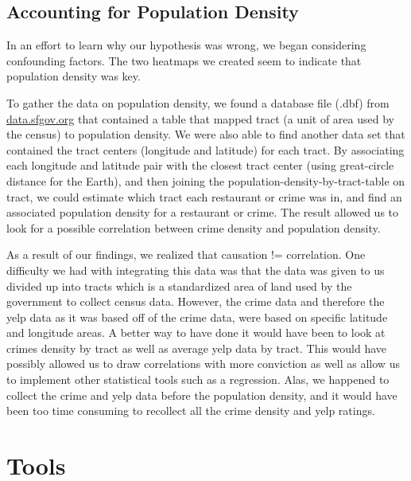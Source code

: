 \documentclass{article}
\begin{document}
\subsection{Accounting for Population Density}

In an effort to learn why our hypothesis was wrong, we began considering
confounding factors. The two heatmaps we created seem to indicate that
population density was key.


To gather the data on population density, we found a database file (.dbf)
from \url{data.sfgov.org} that contained a table that mapped tract (a unit
of area used by the census) to population density. We were also able to
find another data set that contained the tract centers (longitude and
latitude) for each tract. By associating each longitude and latitude pair
with the closest tract center (using great-circle distance for the Earth),
and then joining the population-density-by-tract-table on tract, we could
estimate which tract each restaurant or crime was in, and find an
associated population density for a restaurant or crime. The result allowed
us to look for a possible correlation between crime density and population
density.

As a result of our findings, we realized that causation != correlation.
One difficulty we had with integrating this data was that the data was given to us divided up into tracts which is a standardized area of land used by the government to collect census data. However, the crime data and therefore the yelp data as it was based off of the crime data, were based on specific latitude and longitude areas. A better way to have done it would have been to look at crimes density by tract as well as average yelp data by tract. This would have possibly allowed us to draw correlations with more conviction as well as allow us to implement other statistical tools such as a regression. Alas, we happened to collect the crime and yelp data before the population density, and it would have been too time consuming to recollect all the crime density and yelp ratings.

\section{Tools}
\end{document}
